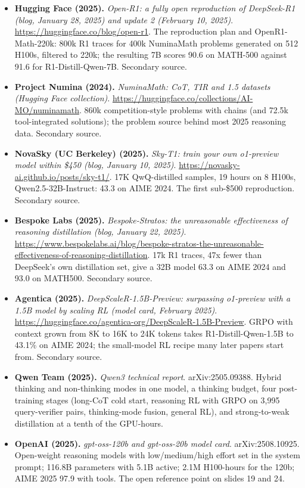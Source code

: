 \begin{itemize}[leftmargin=1.2em,itemsep=3pt]
\item \textbf{Hugging Face (2025).} \textit{Open-R1: a fully open reproduction of DeepSeek-R1 (blog, January 28, 2025) and update 2 (February 10, 2025)}. \url{https://huggingface.co/blog/open-r1}. The reproduction plan and OpenR1-Math-220k: 800k R1 traces for 400k NuminaMath problems generated on 512 H100s, filtered to 220k; the resulting 7B scores 90.6 on MATH-500 against 91.6 for R1-Distill-Qwen-7B. Secondary source.
\item \textbf{Project Numina (2024).} \textit{NuminaMath: CoT, TIR and 1.5 datasets (Hugging Face collection)}. \url{https://huggingface.co/collections/AI-MO/numinamath}. 860k competition-style problems with chains (and 72.5k tool-integrated solutions); the problem source behind most 2025 reasoning data. Secondary source.
\item \textbf{NovaSky (UC Berkeley) (2025).} \textit{Sky-T1: train your own o1-preview model within \$450 (blog, January 10, 2025)}. \url{https://novasky-ai.github.io/posts/sky-t1/}. 17K QwQ-distilled samples, 19 hours on 8 H100s, Qwen2.5-32B-Instruct: 43.3 on AIME 2024. The first sub-\$500 reproduction. Secondary source.
\item \textbf{Bespoke Labs (2025).} \textit{Bespoke-Stratos: the unreasonable effectiveness of reasoning distillation (blog, January 22, 2025)}. \url{https://www.bespokelabs.ai/blog/bespoke-stratos-the-unreasonable-effectiveness-of-reasoning-distillation}. 17k R1 traces, 47x fewer than DeepSeek's own distillation set, give a 32B model 63.3 on AIME 2024 and 93.0 on MATH500. Secondary source.
\item \textbf{Agentica (2025).} \textit{DeepScaleR-1.5B-Preview: surpassing o1-preview with a 1.5B model by scaling RL (model card, February 2025)}. \url{https://huggingface.co/agentica-org/DeepScaleR-1.5B-Preview}. GRPO with context grown from 8K to 16K to 24K tokens takes R1-Distill-Qwen-1.5B to 43.1\% on AIME 2024; the small-model RL recipe many later papers start from. Secondary source.
\item \textbf{Qwen Team (2025).} \textit{Qwen3 technical report}. arXiv:2505.09388. Hybrid thinking and non-thinking modes in one model, a thinking budget, four post-training stages (long-CoT cold start, reasoning RL with GRPO on 3,995 query-verifier pairs, thinking-mode fusion, general RL), and strong-to-weak distillation at a tenth of the GPU-hours.
\item \textbf{OpenAI (2025).} \textit{gpt-oss-120b and gpt-oss-20b model card}. arXiv:2508.10925. Open-weight reasoning models with low/medium/high effort set in the system prompt; 116.8B parameters with 5.1B active; 2.1M H100-hours for the 120b; AIME 2025 97.9 with tools. The open reference point on slides 19 and 24.

\end{itemize}
